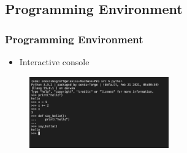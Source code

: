 \subsection{Programming Environment}
\begin{frame}\frametitle{Programming Environment}

   \begin{minipage}{0.4\linewidth}
      \begin{itemize}
         \item Interactive console   
      \end{itemize}
   \end{minipage}
   \begin{minipage}{0.58\linewidth}
      \begin{figure}[H]
         \includegraphics[width=6cm]{../images/illustrations/interactive_console.jpg}
      \end{figure}
   \end{minipage}
\end{frame}



